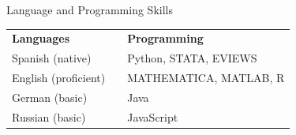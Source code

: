 
\def\arraystretch{1.3}

\begin{rubric}{Language and Programming Skills}
\begin{tabular}{lp{1cm}l}
\textbf{Languages} & & \textbf{Programming} \\
Spanish (native) & & Python, STATA, EVIEWS\\
English (proficient) & & MATHEMATICA, MATLAB, R \\
German (basic) & & Java \\
Russian (basic) & & JavaScript \\
\end{tabular}
\end{rubric} 